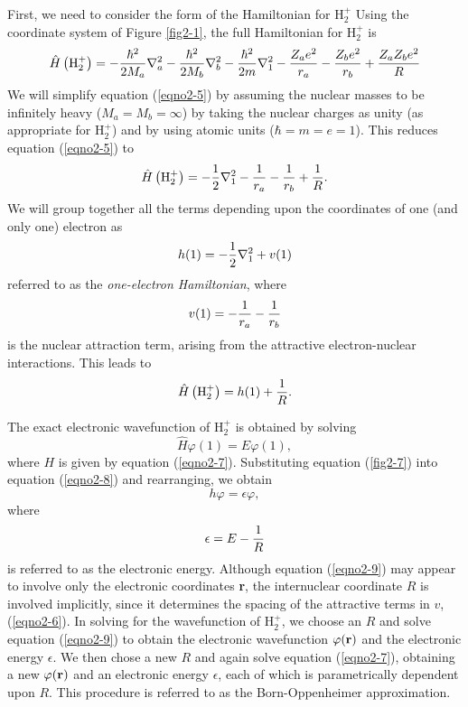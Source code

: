 First, we need to consider the form of the Hamiltonian for H$^+_2$
Using the coordinate system of Figure \ref{fig2-1}, the full
Hamiltonian for H$^+_2$ is
\begin{equation}
{\hat H} \left( \mathrm{H}^+_2 \right) = - {\hbar^2 \over 2M_a} \nabla^2_a - 
{\hbar^2 \over 2M_b} \nabla^2_b - {\hbar^2 \over 2m} \nabla^2_1 - 
{Z_ae^2 \over r_a} - {Z_be^2 \over r_b} + {Z_aZ_be^2 \over R}
\label{eqno2-5}
\end{equation}
We will simplify equation (\ref{eqno2-5}) by assuming the nuclear
masses to be infinitely heavy ($M_a = M_b = \infty$) by taking the
nuclear charges as unity (as appropriate for H$^+_2$) and by using
atomic units ($\hbar = m = e = 1$). This reduces equation
(\ref{eqno2-5}) to
\begin{equation}
{\hat H} \left( \mathrm{H}^+_2 \right) = - {1 \over 2} \nabla^2_1 - {1
\over r_a} - {1 \over r_b} + {1 \over R}.
\end{equation}
We will group together all the terms depending upon the coordinates of one
(and only one) electron as
\begin{equation} 
h(1) = - {1 \over 2} \nabla^2_1 + v(1)
\end{equation}
referred to as the \emph{one-electron Hamiltonian}, where
\begin{equation}
v(1) = - {1 \over r_a} - {1 \over r_b}
\label{eqno2-6}
\end{equation}
is the nuclear attraction term, arising from the attractive 
electron-nuclear interactions.   This leads to
\begin{equation}
{\hat H} \left( \mathrm{H}^+_2 \right) = h ( 1 ) + {1 \over R}.
\label{eqno2-7}
\end{equation}

The exact electronic wavefunction of H$^+_2$ is obtained by solving
\begin{equation}
{\hat H} \varphi ( 1 ) = E \varphi ( 1 ) ,
\label{eqno2-8}
\end{equation}
where $H$ is given by equation (\ref{eqno2-7}). Substituting equation
(\ref{fig2-7}) into equation (\ref{eqno2-8}) and rearranging, we
obtain
\begin{equation}
h \varphi = \epsilon \varphi,
\label{eqno2-9}
\end{equation}
where
\begin{equation}
\epsilon = E - {1 \over R}
\end{equation}
is referred to as the electronic energy.  Although equation
(\ref{eqno2-9}) may appear to involve only the electronic coordinates
{\bf r}, the internuclear coordinate $R$ is involved implicitly, since
it determines the spacing of the attractive terms in $v$,
(\ref{eqno2-6}). In solving for the wavefunction of H$^+_2$, we choose
an $R$ and solve equation (\ref{eqno2-9}) to obtain the electronic
wavefunction $\varphi ( {\bf r})$ and the electronic energy
$\epsilon$. We then chose a new $R$ and again solve equation
(\ref{eqno2-7}), obtaining a new $\varphi ( {\bf r})$ and an
electronic energy $\epsilon$, each of which is parametrically
dependent upon $R$. This procedure is referred to as the
Born-Oppenheimer approximation.

